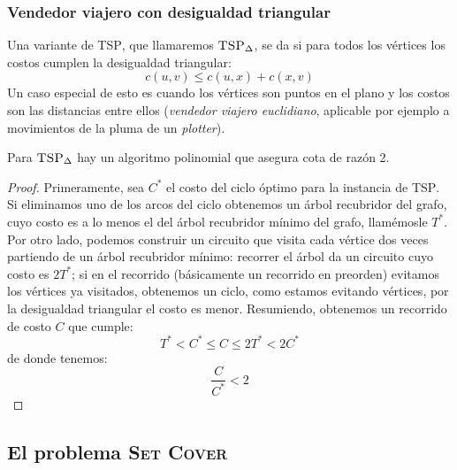 \subsubsection{Vendedor viajero con desigualdad triangular}
\label{sec:TSP-triangle}

  Una variante de \textsc{TSP},
  que llamaremos \(\textsc{TSP}_\Delta\),
  se da si para todos los vértices
  los costos cumplen la desigualdad triangular:
  \begin{equation*}
    c(u, v)
      \le c(u, x) + c(x, v)
  \end{equation*}
  Un caso especial de esto es cuando los vértices son puntos en el plano
  y los costos son las distancias entre ellos
  (\emph{vendedor viajero euclidiano},
   aplicable por ejemplo a movimientos de la pluma de un \emph{plotter}).

  \begin{theorem}
    \label{theo:TSC-triangle-approx}
    Para \(\textsc{TSP}_\Delta\)
    hay un algoritmo polinomial que asegura cota de razón \num{2}.
  \end{theorem}
  \begin{proof}
    Primeramente,
    sea \(C^*\) el costo del ciclo óptimo para la instancia de \textsc{TSP}.
    Si eliminamos uno de los arcos del ciclo
    obtenemos un árbol recubridor del grafo,
    cuyo costo es a lo menos el del árbol recubridor mínimo del grafo,
    llamémosle \(T^*\).
    Por otro lado,
    podemos construir un circuito que visita cada vértice dos veces
    partiendo de un árbol recubridor mínimo:
    recorrer el árbol  da un circuito
    cuyo costo es \(2 T^*\);
    si en el recorrido
    (básicamente un recorrido en preorden)
    evitamos los vértices ya visitados,
    obtenemos un ciclo,
    como estamos evitando vértices,
    por la desigualdad triangular el costo es menor.
    Resumiendo,
    obtenemos un recorrido de costo \(C\)
    que cumple:
    \begin{equation*}
      T^*
        <	  C^*
        \le C
        \le 2 T^*
        <	  2 C^*
    \end{equation*}
    de donde tenemos:
    \begin{equation*}
      \frac{C}{C^*}
        < 2
    \end{equation*}
    \qedhere
  \end{proof}

\subsection{El problema \textsc{Set Cover}}
\label{sec:SetCover}

